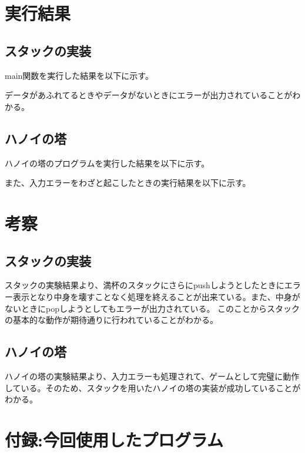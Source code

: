 \documentclass[dvipdfmx]{jsarticle}
\begin{document}
\section{実行結果}
\subsection{スタックの実装}
main関数を実行した結果を以下に示す。

データがあふれてるときやデータがないときにエラーが出力されていることがわかる。
\subsection{ハノイの塔}
ハノイの塔のプログラムを実行した結果を以下に示す。

\newpage
また、入力エラーをわざと起こしたときの実行結果を以下に示す。\\


\section{考察}
\subsection{スタックの実装}
スタックの実験結果より、満杯のスタックにさらにpushしようとしたときにエラー表示となり中身を壊すことなく処理を終えることが出来ている。また、中身がないときにpopしようとしてもエラーが出力されている。
このことからスタックの基本的な動作が期待通りに行われていることがわかる。
\subsection{ハノイの塔}
ハノイの塔の実験結果より、入力エラーも処理されて、ゲームとして完璧に動作している。そのため、スタックを用いたハノイの塔の実装が成功していることがわかる。

\section{付録:今回使用したプログラム}


\end{document}
